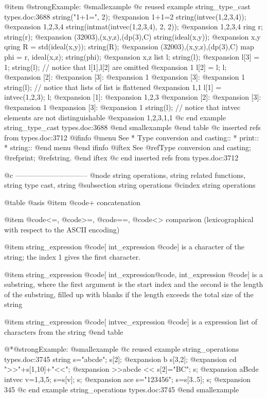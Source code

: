 {{{{{{@item @strong{Example:}
@smallexample
@c reused example string_type_cast types.doc:3688 
  string("1+1=", 2);
@expansion{} 1+1=2
  string(intvec(1,2,3,4));
@expansion{} 1,2,3,4
  string(intmat(intvec(1,2,3,4), 2, 2));
@expansion{} 1,2,3,4 
  ring r;
  string(r);
@expansion{} (32003),(x,y,z),(dp(3),C)
  string(ideal(x,y));
@expansion{} x,y
  qring R = std(ideal(x,y));
  string(R);
@expansion{} (32003),(x,y,z),(dp(3),C)
  map phi = r, ideal(x,z);
  string(phi);
@expansion{} x,z
  list l;
  string(l);
@expansion{} 
  l[3] = 1;
  string(l); // notice that l[1],l[2] are omitted
@expansion{} 1
  l[2] = l;
  l;
@expansion{} [2]:
@expansion{}    [3]:
@expansion{}       1
@expansion{} [3]:
@expansion{}    1
  string(l); // notice that lists of list is flattened
@expansion{} 1,1
  l[1] = intvec(1,2,3);
  l;
@expansion{} [1]:
@expansion{}    1,2,3
@expansion{} [2]:
@expansion{}    [3]:
@expansion{}       1
@expansion{} [3]:
@expansion{}    1
  string(l); // notice that intvec elements are not distinguishable
@expansion{} 1,2,3,1,1
@c end example string_type_cast types.doc:3688
@end smallexample
@end table
@c inserted refs from types.doc:3712
@ifinfo
@menu
See
* Type conversion and casting::
* print::
* string::
@end menu
@end ifinfo
@iftex
See
@ref{Type conversion and casting};
@ref{print};
@ref{string}.
@end iftex
@c end inserted refs from types.doc:3712

@c ------------------------------
@node string operations, string related functions, string type cast, string
@subsection string operations
@cindex string operations

@table @asis
@item @code{+}
concatenation

@item @code{<=}, @code{>=}, @code{==}, @code{<>}
comparison (lexicographical with respect to the ASCII encoding)

@item string_expression @code{[} int_expression @code{]}
is a character of the string; the index 1 gives the first character.

@item string_expression @code{[} int_expression@code{,} int_expression @code{]}
is a substring, where the first argument is the start index and the
second is the length of the substring, filled up with blanks if the
length exceeds the total size of the string

@item string_expression @code{[} intvec_expression @code{]}
is a expression list of characters from the string
@end table

@*@strong{Example:}
@smallexample
@c reused example string_operations types.doc:3745 
  string s="abcde";
  s[2];
@expansion{} b
  s[3,2];
@expansion{} cd
  ">>"+s[1,10]+"<<";
@expansion{} >>abcde     <<
  s[2]="BC"; s;
@expansion{} aBcde
  intvec v=1,3,5;
  s=s[v]; s;
@expansion{} ace
  s="123456"; s=s[3..5]; s;
@expansion{} 345
@c end example string_operations types.doc:3745
@end smallexample

}}}}}}
